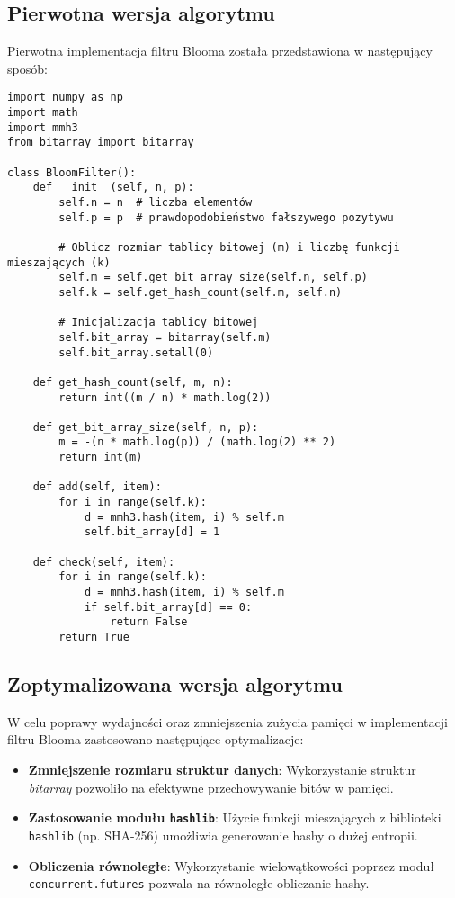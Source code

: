 \documentclass{article}
\begin{document}
\subsection{Pierwotna wersja algorytmu}

Pierwotna implementacja filtru Blooma została przedstawiona w następujący sposób:

\begin{lstlisting}[style=pystyle, caption=Pierwotna implementacja filtru Blooma]
import numpy as np
import math
import mmh3
from bitarray import bitarray

class BloomFilter():
    def __init__(self, n, p):
        self.n = n  # liczba elementów
        self.p = p  # prawdopodobieństwo fałszywego pozytywu

        # Oblicz rozmiar tablicy bitowej (m) i liczbę funkcji mieszających (k)
        self.m = self.get_bit_array_size(self.n, self.p)
        self.k = self.get_hash_count(self.m, self.n)

        # Inicjalizacja tablicy bitowej
        self.bit_array = bitarray(self.m)
        self.bit_array.setall(0)

    def get_hash_count(self, m, n):
        return int((m / n) * math.log(2))

    def get_bit_array_size(self, n, p):
        m = -(n * math.log(p)) / (math.log(2) ** 2)
        return int(m)

    def add(self, item):
        for i in range(self.k):
            d = mmh3.hash(item, i) % self.m
            self.bit_array[d] = 1

    def check(self, item):
        for i in range(self.k):
            d = mmh3.hash(item, i) % self.m
            if self.bit_array[d] == 0:
                return False
        return True
\end{lstlisting}

\subsection{Zoptymalizowana wersja algorytmu}

W celu poprawy wydajności oraz zmniejszenia zużycia pamięci w implementacji filtru Blooma zastosowano następujące optymalizacje:

\begin{itemize}
    \item \textbf{Zmniejszenie rozmiaru struktur danych}: Wykorzystanie struktur \textit{bitarray} pozwoliło na efektywne przechowywanie bitów w pamięci.
    \item \textbf{Zastosowanie modułu \texttt{hashlib}}: Użycie funkcji mieszających z biblioteki \texttt{hashlib} (np. SHA-256) umożliwia generowanie hashy o dużej entropii.
    \item \textbf{Obliczenia równoległe}: Wykorzystanie wielowątkowości poprzez moduł \texttt{concurrent.futures} pozwala na równoległe obliczanie hashy.
\end{itemize}
\end{document}
